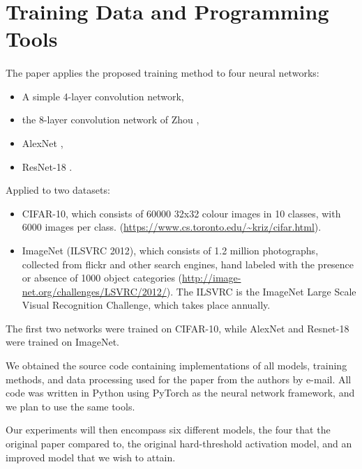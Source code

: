 \section{Training Data and Programming Tools}\label{tools}
\paragraph{}
The paper applies the proposed training method to four neural networks:

\begin{itemize}
\item A simple 4-layer convolution network,
\item the 8-layer convolution network of Zhou \cite{zhou2016dorefa},
\item AlexNet \cite{alexnet},
\item ResNet-18 \cite{resnet18}.
\end{itemize}

Applied to two datasets:

\begin{itemize}
\item CIFAR-10, which consists of 60000 32x32 colour images in 10 classes, with 6000 images per class. (\url{https://www.cs.toronto.edu/~kriz/cifar.html}).
\item ImageNet (ILSVRC 2012), which consists of 1.2 million photographs, collected from flickr and other search engines, hand labeled with the presence or absence of 1000 object categories (\url{http://image-net.org/challenges/LSVRC/2012/}). The ILSVRC is the ImageNet Large Scale Visual Recognition Challenge, which takes place annually.
\end{itemize}

The first two networks were trained on CIFAR-10, while AlexNet and Resnet-18 were trained on ImageNet. 

We obtained the source code containing implementations of all models, training methods, and data processing used for the paper from the authors by e-mail. All code was written in Python using PyTorch as the neural network framework, and we plan to use the same tools.

Our experiments will then encompass six different models, the four that the original paper compared to, the original hard-threshold activation model, and an improved model that we wish to attain.